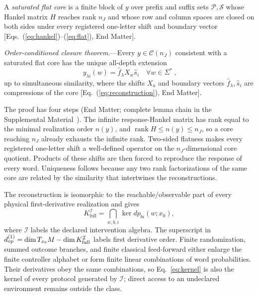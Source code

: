 \documentclass[aps,prl,reprint,superscriptaddress,nofootinbib]{revtex4-2}
\newcommand{\rank}{\operatorname{rank}}
\newcommand{\full}{\mathrm{full}}
\begin{document}
A \emph{saturated flat core} is a finite block of $y$ over prefix and suffix sets $\mathcal P,\mathcal S$ whose Hankel matrix $H$ reaches rank $n_J$ and whose row and column spaces are closed on both sides under every registered one-letter shift and boundary vector [Eqs.~(\ref{eq:hankel})--(\ref{eq:flat}), End Matter].

\textit{Order-conditioned closure theorem.}---Every $y\in\mathcal C(n_J)$ consistent with a saturated flat core has the unique all-depth extension
\begin{equation}
 \boxed{\ y_{\lambda i}(w)=\widehat f_\lambda X_w\widehat s_i
 \quad\forall w\in\Sigma^*\ },
 \label{eq:extension}
\end{equation}
up to simultaneous similarity, where the shifts $X_a$ and boundary vectors $\widehat f_\lambda,\widehat s_i$ are compressions of the core [Eq.~(\ref{eq:reconstruction}), End Matter].

The proof has four steps (End Matter; complete lemma chain in the Supplemental Material~\cite{SupplementalMaterial}).  The infinite response-Hankel matrix has rank equal to the minimal realization order $n(y)$, and $\rank H\le n(y)\le n_J$, so a core reaching $n_J$ already exhausts the infinite rank.  Two-sided flatness makes every registered one-letter shift a well-defined operator on the $n_J$-dimensional core quotient.  Products of these shifts are then forced to reproduce the response of every word.  Uniqueness follows because any two rank factorizations of the same core are related by the similarity that intertwines the reconstructions.

The reconstruction is isomorphic to the reachable/observable part of every physical first-derivative realization and gives
\begin{equation}
 K_{\full}^{\mathcal I}=
 \bigcap_{w,b,i}\ker dp_{bi}(w;x_0),
 \label{eq:kernel}
\end{equation}
where $\mathcal I$ labels the declared intervention algebra.  The superscript in $d_{\rm op}^{(1)}=\dim T_{x_0}M-\dim K_{\full}^{\mathcal I}$ labels first derivative order.  Finite randomization, summed outcome branches, and finite classical feed-forward either enlarge the finite controller alphabet or form finite linear combinations of word probabilities.  Their derivatives obey the same combinations, so Eq.~\eqref{eq:kernel} is also the kernel of every protocol generated by $\mathcal I$; direct access to an undeclared environment remains outside the class.
\end{document}
